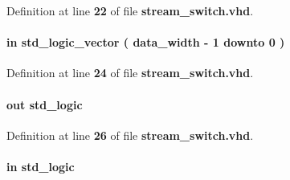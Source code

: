 Definition at line {\bf 22} of file {\bf stream\+\_\+switch.\+vhd}.

\paragraph[{data\+\_\+in}]{ {\bfseries \textcolor{keywordflow}{in}\textcolor{vhdlchar}{ }} {\bfseries \textcolor{comment}{std\+\_\+logic\+\_\+vector}\textcolor{vhdlchar}{ }\textcolor{vhdlchar}{(}\textcolor{vhdlchar}{ }\textcolor{vhdlchar}{ }\textcolor{vhdlchar}{ }\textcolor{vhdlchar}{ }{\bfseries {\bf data\+\_\+width}} \textcolor{vhdlchar}{-\/}\textcolor{vhdlchar}{ } \textcolor{vhdldigit}{1} \textcolor{vhdlchar}{ }\textcolor{keywordflow}{downto}\textcolor{vhdlchar}{ }\textcolor{vhdlchar}{ } \textcolor{vhdldigit}{0} \textcolor{vhdlchar}{ }\textcolor{vhdlchar}{)}\textcolor{vhdlchar}{ }} \hspace{0.3cm}{\ttfamily [Port]}}\label{classstream__switch_ae8970283125be754ef38cafeb364ecd9}


Definition at line {\bf 24} of file {\bf stream\+\_\+switch.\+vhd}.

\paragraph[{data\+\_\+in\+\_\+rdy}]{ {\bfseries \textcolor{keywordflow}{out}\textcolor{vhdlchar}{ }} {\bfseries \textcolor{comment}{std\+\_\+logic}\textcolor{vhdlchar}{ }} \hspace{0.3cm}{\ttfamily [Port]}}\label{classstream__switch_a0f5e60b83171d50f1f98684aa7d0c891}


Definition at line {\bf 26} of file {\bf stream\+\_\+switch.\+vhd}.

\paragraph[{data\+\_\+in\+\_\+valid}]{ {\bfseries \textcolor{keywordflow}{in}\textcolor{vhdlchar}{ }} {\bfseries \textcolor{comment}{std\+\_\+logic}\textcolor{vhdlchar}{ }} \hspace{0.3cm}{\ttfamily [Port]}}\label{classstream__switch_a9fe0a9f38dccdb91d670106b4bbac6fd}


